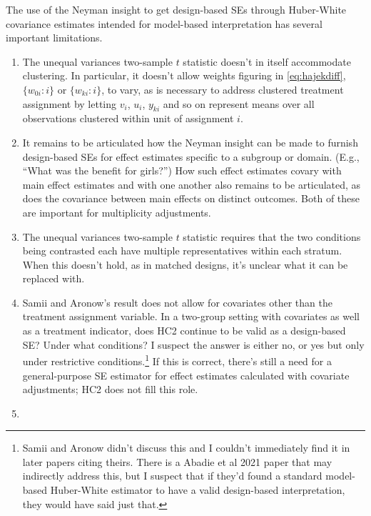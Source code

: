 The use of the Neyman insight to get design-based SEs through
Huber-White covariance estimates intended for model-based interpretation 
has several important limitations.

\begin{enumerate}
\def\labelenumi{\arabic{enumi}.}
\item \label{it:prob-noweights}
  The unequal variances two-sample \(t\) statistic doesn't in itself accommodate
  clustering.  In particular, it doesn't allow weights figuring in \eqref{eq:hajekdiff}, 
$\{w_{0i} :i\}$ or  $\{w_{ki} :i\}$, to vary, as is necessary
to address clustered treatment assignment by letting $v_{i}$, $u_{i}$,
$y_{ki}$ and so on
represent means over all observations clustered within unit of
assignment $i$. 
\item \label{it:moderators-multiple-outcomes}  It remains to be
  articulated how the Neyman insight can be made to furnish design-based SEs
  for effect estimates specific to a subgroup or domain. (E.g., ``What was
  the benefit for girls?'') How such
  effect estimates covary with main effect
  estimates and with one another also remains to be articulated, as
  does the covariance between main effects on distinct outcomes. Both
  of these are important for multiplicity adjustments.   
\item \label{it:prob-multreps}
  The unequal variances two-sample \(t\) statistic requires that the two
  conditions being contrasted each have multiple representatives within
  each stratum. When this doesn't hold, as in matched designs, it's
  unclear what it can be replaced with.
\item \label{it:prob-covars}
  Samii and Aronow's result does not allow for covariates other than the
  treatment assignment variable. In a two-group setting with covariates
  as well as a treatment indicator, does HC2 continue to be valid as a
  design-based SE? Under what conditions? I suspect the answer is either
  no, or yes but only under restrictive conditions.\footnote{Samii and
    Aronow didn't discuss this and I couldn't immediately find it in
    later papers citing theirs. There is a Abadie et al 2021 paper that
    may indirectly address this, but I suspect that if they'd found a
    standard model-based Huber-White estimator to have a valid
    design-based interpretation, they would have said just that.}
  If this is correct,  there's still a need for a general-purpose SE
  estimator for effect estimates calculated with
covariate adjustments; HC2 does not fill this role.  
\item \label{it:prob-differentstatuses}

\end{enumerate}
